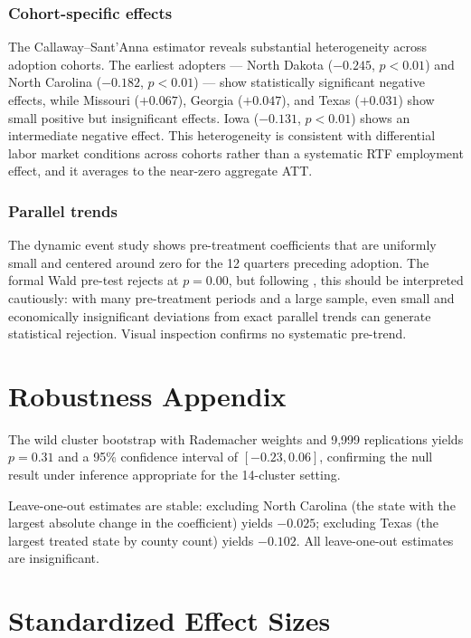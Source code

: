 \documentclass[12pt]{article}
\begin{document}
\subsubsection*{Cohort-specific effects} The Callaway--Sant'Anna estimator reveals substantial heterogeneity across adoption cohorts. The earliest adopters --- North Dakota ($-0.245$, $p < 0.01$) and North Carolina ($-0.182$, $p < 0.01$) --- show statistically significant negative effects, while Missouri ($+0.067$), Georgia ($+0.047$), and Texas ($+0.031$) show small positive but insignificant effects. Iowa ($-0.131$, $p < 0.01$) shows an intermediate negative effect. This heterogeneity is consistent with differential labor market conditions across cohorts rather than a systematic RTF employment effect, and it averages to the near-zero aggregate ATT.

\subsubsection*{Parallel trends} The dynamic event study shows pre-treatment coefficients that are uniformly small and centered around zero for the 12 quarters preceding adoption. The formal Wald pre-test rejects at $p = 0.00$, but following \citet{roth2022}, this should be interpreted cautiously: with many pre-treatment periods and a large sample, even small and economically insignificant deviations from exact parallel trends can generate statistical rejection. Visual inspection confirms no systematic pre-trend.

\section{Robustness Appendix}

The wild cluster bootstrap with Rademacher weights and 9,999 replications yields $p = 0.31$ and a 95\% confidence interval of $[-0.23, 0.06]$, confirming the null result under inference appropriate for the 14-cluster setting.

Leave-one-out estimates are stable: excluding North Carolina (the state with the largest absolute change in the coefficient) yields $-0.025$; excluding Texas (the largest treated state by county count) yields $-0.102$. All leave-one-out estimates are insignificant.

\section{Standardized Effect Sizes}
\label{sec:sde}


\end{document}
